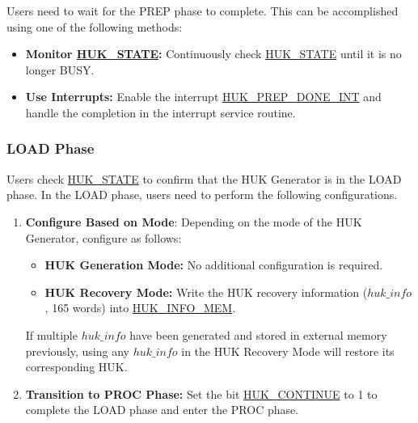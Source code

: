 \documentclass[main\_\_EN.tex]{subfiles}
\begin{document}
Users need to wait for the PREP phase to complete. This can be accomplished using one of the following methods:
\begin{itemize}
    \item \textbf{Monitor \hyperref[fielddesc:HUKSTATE]{HUK\_STATE}:} Continuously check \hyperref[fielddesc:HUKSTATE]{HUK\_STATE} until it is no longer BUSY.
    \item \textbf{Use Interrupts:} Enable the interrupt \hyperref[int:HUKPREPDONEINT]{HUK\_PREP\_DONE\_INT} and handle the completion in the interrupt service routine.
\end{itemize}


\subsubsection{LOAD Phase}

Users check \hyperref[fielddesc:HUKSTATE]{HUK\_STATE} to confirm that the HUK Generator is in the LOAD phase. In the LOAD phase, users need to perform the following configurations.
\begin{enumerate}
    \item \textbf{Configure Based on Mode}: Depending on the mode of the HUK Generator, configure as follows:
    \begin{itemize}
        \item \textbf{HUK Generation Mode:} No additional configuration is required.
        \item \textbf{HUK Recovery Mode:} Write the HUK recovery information (\hyperref[para:hukinfo]{\begin{math}huk\_info\end{math}}, 165 words) into \hyperref[mem:huk-info]{HUK\_INFO\_MEM}.
    \end{itemize}
    \vspace{-0.5em}
    \begin{tiplisting}
    If multiple \hyperref[para:hukinfo]{\begin{math}huk\_info\end{math}} have been generated and stored in external memory previously, using any \hyperref[para:hukinfo]{\begin{math}huk\_info\end{math}} in the HUK Recovery Mode will restore its corresponding HUK.
    \end{tiplisting}
    \item \textbf{Transition to PROC Phase:} Set the bit \hyperref[fielddesc:HUKCONTINUE]{HUK\_CONTINUE} to 1 to complete the LOAD phase and enter the PROC phase.
\end{enumerate}
\end{document}
